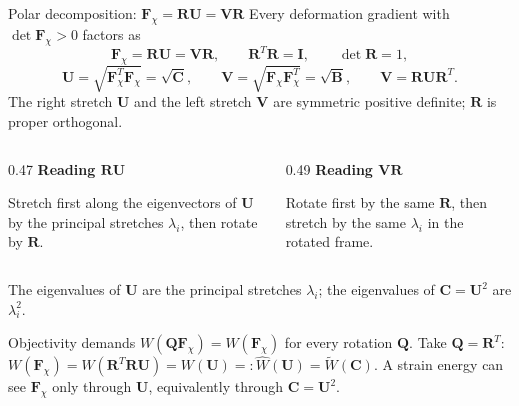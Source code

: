 \documentclass[aspectratio=169,11pt]{beamer}
\newcommand{\I}{\bm{I}}
\newcommand{\Fdef}{\bm{F}_{\chi}}
\newcommand{\Cten}{\bm{C}}
\newcommand{\Bten}{\bm{B}}
\begin{document}
\begin{frame}{Polar decomposition: \(\Fdef=\bm{R}\bm{U}=\bm{V}\bm{R}\)}
\small
Every deformation gradient with \(\det\Fdef>0\) factors  as
\[
  \boxed{\Fdef=\bm{R}\bm{U}=\bm{V}\bm{R}},
  \qquad
  \bm{R}^T\bm{R}=\I,
  \qquad
  \det\bm{R}=1,
\]
\[
  \bm{U}=\sqrt{\Fdef^T\Fdef}=\sqrt{\Cten},
  \qquad
  \bm{V}=\sqrt{\Fdef\Fdef^T}=\sqrt{\Bten},
  \qquad
  \bm{V}=\bm{R}\bm{U}\bm{R}^T .
\]
The right stretch \(\bm{U}\) and the left stretch \(\bm{V}\) are symmetric positive definite; \(\bm{R}\) is proper orthogonal.
\begin{columns}[T,onlytextwidth]
\begin{column}{0.47\textwidth}
\textbf{Reading \(\bm{R}\bm{U}\)}

Stretch first along the eigenvectors of \(\bm{U}\) by the principal stretches \(\lambda_i\), then rotate by \(\bm{R}\).
\end{column}
\begin{column}{0.49\textwidth}
\textbf{Reading \(\bm{V}\bm{R}\)}

Rotate first by the same \(\bm{R}\), then stretch by the same \(\lambda_i\) in the rotated frame.
\end{column}
\end{columns}
\smallskip

The eigenvalues of \(\bm{U}\) are the principal stretches \(\lambda_i\); the eigenvalues of \(\Cten=\bm{U}^2\) are \(\lambda_i^2\).
\medskip
\begin{punchbox}
\footnotesize
{} Objectivity demands \(W(\bm{Q}\Fdef)=W(\Fdef)\) for every rotation \(\bm{Q}\). Take \(\bm{Q}=\bm{R}^T\):
\(W(\Fdef)=W(\bm{R}^T\bm{R}\bm{U})=W(\bm{U})=:\widehat W(\bm{U})=\widetilde W(\Cten)\).
A strain energy can see \(\Fdef\) only through \(\bm{U}\), equivalently through \(\Cten=\bm{U}^2\).
\end{punchbox}
\end{frame}
\end{document}
